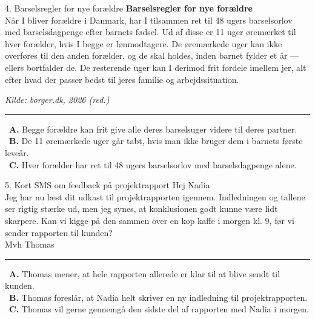 \begin{emailbox}{4. Barselsregler for nye forældre}
\textbf{Barselsregler for nye forældre}\\
Når I bliver forældre i Danmark, har I tilsammen ret til 48 ugers barselsorlov med barselsdagpenge efter barnets fødsel. Ud af disse er 11 uger øremærket til hver forælder, hvis I begge er lønmodtagere. De øremærkede uger kan ikke overføres til den anden forælder, og de skal holdes, inden barnet fylder et år --- ellers bortfalder de. De resterende uger kan I derimod frit fordele imellem jer, alt efter hvad der passer bedst til jeres familie og arbejdssituation.
\par\noindent\hfill {\small\textit{Kilde: borger.dk, 2026 (red.)}}

\vspace{0.3em}
\hrule
\vspace{0.3em}
\small
\fbox{\phantom{X}}\ \textbf{A.} Begge forældre kan frit give alle deres barselsuger videre til deres partner.\\[0.25em]
\fbox{\phantom{X}}\ \textbf{B.} De 11 øremærkede uger går tabt, hvis man ikke bruger dem i barnets første leveår.\\[0.25em]
\fbox{\phantom{X}}\ \textbf{C.} Hver forælder har ret til 48 ugers barselsorlov med barselsdagpenge alene.
\end{emailbox}

\begin{emailbox}{5. Kort SMS om feedback på projektrapport}
Hej Nadia\\
Jeg har nu læst dit udkast til projektrapporten igennem. Indledningen og tallene ser rigtig stærke ud, men jeg synes, at konklusionen godt kunne være lidt skarpere. Kan vi kigge på den sammen over en kop kaffe i morgen kl. 9, før vi sender rapporten til kunden?\\
Mvh Thomas

\vspace{0.3em}
\hrule
\vspace{0.3em}
\small
\fbox{\phantom{X}}\ \textbf{A.} Thomas mener, at hele rapporten allerede er klar til at blive sendt til kunden.\\[0.25em]
\fbox{\phantom{X}}\ \textbf{B.} Thomas foreslår, at Nadia helt skriver en ny indledning til projektrapporten.\\[0.25em]
\fbox{\phantom{X}}\ \textbf{C.} Thomas vil gerne gennemgå den sidste del af rapporten med Nadia i morgen.
\end{emailbox}


